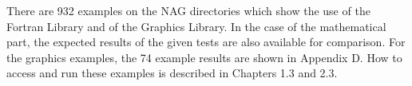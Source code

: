  
  There are 932 examples on the NAG directories which show the use
of the Fortran Library and of the Graphics Library. In the case of the
mathematical part, the expected results of the given tests are also
available for comparison. For the graphics examples, the 74 example
results are shown in Appendix D. How to access and run these examples is
described in Chapters 1.3 and 2.3.
 
